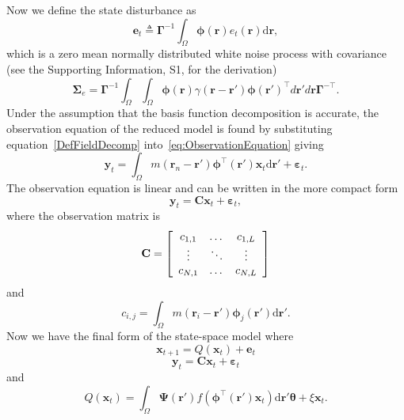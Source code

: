 \documentclass[10pt]{article}
\begin{document}
Now we define the state disturbance as
\begin{equation}\label{eq:Wt} 
	\mathbf{e}_t \triangleq \boldsymbol{\Gamma}^{-1}\int_\Omega {\boldsymbol{\phi} ( \mathbf{r} )e_t( \mathbf{r} )\textrm{d}\mathbf{r}},
\end{equation}
which is a zero mean normally distributed white noise process with covariance (see the Supporting Information, S1, for the derivation)
\begin{equation}
	\boldsymbol\Sigma_e =\mathbf{\Gamma}^{-1}\int_{\Omega}\int_{\Omega}\boldsymbol{\phi}\left(\mathbf r\right) \gamma\left(\mathbf r- \mathbf r' \right)\boldsymbol{\phi}\left(\mathbf r'\right)^{\top}d\mathbf r' d\mathbf r\mathbf{\Gamma}^{- \top}. 
\end{equation}
Under the assumption that the basis function decomposition is accurate, the observation equation of the reduced model is found by substituting equation~\ref{DefFieldDecomp} into~\ref{eq:ObservationEquation} giving
\begin{equation}\label{eq:ReducedObservationEquation}
	\mathbf{y}_t = \int_{\Omega}{m\left(\mathbf{r}_n-\mathbf{r}'\right)\boldsymbol{\phi}^{\top}\left(\mathbf{r'}\right) \mathbf{x}_t\textrm{d}\mathbf{r}'} + \boldsymbol{\varepsilon}_t. 
\end{equation}
The observation equation is linear and can be written in the more compact form
\begin{equation}\label{ObservationEquation} 
	\mathbf{y}_t = \mathbf{C}\mathbf{x}_t + \boldsymbol{\varepsilon}_t,
\end{equation}
where the observation matrix is 
\begin{equation}
	\mathbf{C} = \left[
	\begin{array}{{ccc}} 
		c_{1,1} & \dots & c_{1,L} \\
		\vdots & \ddots & \vdots \\
		c_{N,1} & \dots & c_{N,L} 
	\end{array}
	\right] 
\end{equation}
and 
\begin{equation}
	c_{i,j} = \int_{\Omega}m(\mathbf{r}_i - \mathbf{r}')\boldsymbol{\phi}_j(\mathbf{r}')\textrm{d}\mathbf{r}'. 
\end{equation}
Now we have the final form of the state-space model where
\begin{equation}\label{eq:finalformstatespacemodel}
	\mathbf{x}_{t+1} = Q(\mathbf{x}_t) +\mathbf{e}_t
\end{equation}
\begin{equation} 
	\mathbf{y}_t = \mathbf{C}\mathbf{x}_t + \boldsymbol{\varepsilon}_t
\end{equation}
and 
\begin{equation}\label{eq:QmatrixForSigmapoints}
	Q(\mathbf{x}_t) = \int_\Omega \boldsymbol{\Psi}(\mathbf{r}') f(\boldsymbol{\phi}^{\top}(\mathbf{r}')\mathbf{x}_t) \textrm{d}\mathbf{r}' \boldsymbol{\theta} + \xi\mathbf{x}_t.
\end{equation}
\end{document}
